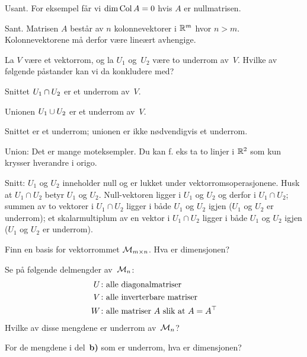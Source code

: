 \begin{losning}

\begin{punkt}
Usant.  For eksempel får vi $\dim \operatorname{Col} A = 0$ hvis $A$ er nullmatrisen.
\end{punkt}

\begin{punkt}
Sant. Matrisen $A$ består av $n$ kolonnevektorer i $\mathbb{R}^m$ hvor $n>m$.
Kolonnevektorene må derfor være lineært avhengige.
\end{punkt}

\end{losning}


\begin{oppgave}
La $V$ være et vektorrom, og la $U_1$ og~$U_2$ være to underrom
av~$V$.  Hvilke av følgende påstander kan vi da konkludere med?
\begin{punkt}
Snittet $U_1 \cap U_2$ er et underrom av~$V$.
\end{punkt}
\begin{punkt}
Unionen $U_1 \cup U_2$ er et underrom av~$V$.
\end{punkt}
\end{oppgave}

\begin{losning}
Snittet er et underrom; unionen er ikke nødvendigvis et underrom.


\noindent
Union: Det er mange moteksempler. Du kan f. eks ta to linjer i $\mathbb{R}^2$ som kun krysser hverandre i origo.

\noindent
Snitt: $U_1$ og $U_2$ inneholder null og er lukket under vektorromsoperasjonene. Husk at $U_1 \cap U_2$ betyr $U_1$ og $U_2$. Null-vektoren ligger i $U_1$ og $U_2$ og derfor i $U_1\cap U_2$; summen av to vektorer i $U_1\cap U_2$ ligger i både $U_1$ og $U_2$ igjen ($U_1$ og $U_2$ er underrom); et skalarmultiplum av en vektor i $U_1\cap U_2$ ligger i både $U_1$ og $U_2$ igjen ($U_1$ og $U_2$ er underrom).
\end{losning}


\begin{oppgave}

\begin{punkt}
Finn en basis for vektorrommet $\mathcal{M}_{m \times n}$.  Hva er dimensjonen?
\end{punkt}

\begin{punkt}
Se på følgende delmengder av~$\mathcal{M}_n$:
\begin{align*}
U \colon &\text{alle diagonalmatriser} \\
V \colon &\text{alle inverterbare matriser} \\
W \colon &\text{alle matriser~$A$ slik at $A = A^\top$}
\end{align*}
Hvilke av disse mengdene er underrom av~$\mathcal{M}_n$?
\end{punkt}

\begin{punkt}
For de mengdene i del~\textbf{b)} som er underrom, hva er dimensjonen?
\end{punkt}
\end{oppgave}

